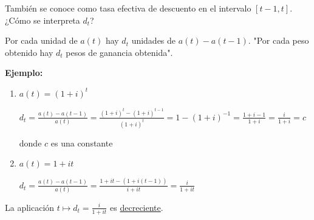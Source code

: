 También se conoce como tasa efectiva de descuento en el intervalo $\left[ t-1, t\right] $. ¿Cómo se interpreta $d_t$?

Por cada unidad de $a(t)$ hay $d_t$ unidades de $a(t)-a(t-1)$. "Por cada peso obtenido hay $d_t$ pesos de ganancia obtenida".

\textbf{Ejemplo:}
\begin{enumerate}
\item $a(t) = (1+i)^t$

$d_t = \frac{a(t) - a(t-1)}{a(t)} = \frac{(1+i)^t - (1+i)^{t-1}}{(1+i)^t} = 1 - (1+i)^{-1} = \frac{1+i-1}{1+i} = \frac{i}{1+i} = c$

donde $c$ es una constante
\item $a(t) = 1+it$

$d_t = \frac{a(t) - a(t-1)}{a(t)} = \frac{1 + it - (1 + i(t - 1))}{i + it} = \frac{i}{1 + it}$
\end{enumerate}

\begin{remark}
La aplicación $t \longmapsto d_t = \frac{i}{1 + it}$ es \underline{decreciente}.
\end{remark}

